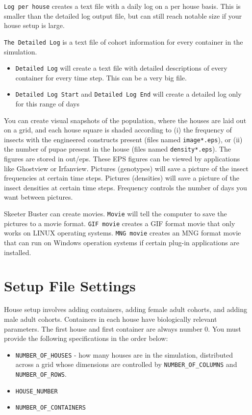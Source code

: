 \documentclass[11pt]{article}
\newcommand{\linecmd}[1]{\texttt{#1}}
\begin{document}
\linecmd{Log per house} creates a text file with a daily log on a per house basis. This is smaller than the detailed log output file, but can still reach notable size if your house setup is large.

\linecmd{The Detailed Log} is a text file of cohort information for every container in the simulation.
\begin{itemize}
	\item \linecmd{Detailed Log} will create a text file with detailed descriptions of every container for every time step. This can be a very big file.
	\item \linecmd{Detailed Log Start} and \linecmd{Detailed Log End} will create a detailed log only for this range of days
\end{itemize}

You can create visual snapshots of the population, where the houses are laid out on a grid, and each house square is shaded according to (i) the frequency of insects with the engineered constructs present (files named \linecmd{image*.eps}), or (ii) the number of pupae present in the house (files named \linecmd{density*.eps}). The figures are stored in out/eps. These EPS figures can be viewed by applications like Ghostview or Irfanview. Pictures (genotypes) will save a picture of the insect frequencies at certain time steps. Pictures (densities) will save a picture of the insect densities at certain time steps. Frequency controls the number of days you want between pictures.

Skeeter Buster can create movies. \linecmd{Movie} will tell the computer to save the pictures to a movie format. \linecmd{GIF movie} creates a GIF format movie that only works on LINUX operating systems. \linecmd{MNG movie} creates an MNG format movie that can run on Windows operation systems if certain plug-in applications are installed.%

\section{Setup File Settings}

House setup involves adding containers, adding female adult cohorts, and adding male adult cohorts. Containers in each house have biologically relevant parameters. The first house and first container are always number $0$. You must provide the following specifications in the order below:

\begin{itemize}
	\item \linecmd{NUMBER\_OF\_HOUSES} - how many houses are in the simulation, distributed across a grid whose dimensions are controlled by \linecmd{NUMBER\_OF\_COLUMNS} and \linecmd{NUMBER\_OF\_ROWS}.
	\item \linecmd{HOUSE\_NUMBER}
	\item \linecmd{NUMBER\_OF\_CONTAINERS}
\end{itemize}
\end{document}
